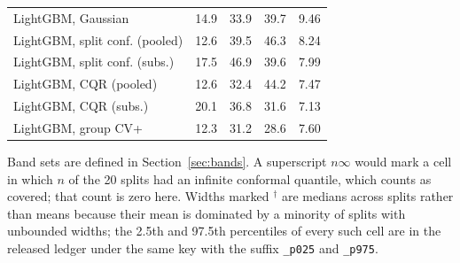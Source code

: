 \begin{table}[!tp]
\begin{tabular}{@{}lrrrr@{}}
\quad LightGBM, Gaussian & 14.9 & 33.9 & 39.7 & 9.46 \\
\quad LightGBM, split conf. (pooled) & 12.6 & 39.5 & 46.3 & 8.24 \\
\quad LightGBM, split conf. (subs.) & 17.5 & 46.9 & 39.6 & 7.99 \\
\quad LightGBM, CQR (pooled) & 12.6 & 32.4 & 44.2 & 7.47 \\
\quad LightGBM, CQR (subs.) & 20.1 & 36.8 & 31.6 & 7.13 \\
\quad LightGBM, group CV+ & 12.3 & 31.2 & 28.6 & 7.60 \\
\bottomrule
\end{tabular}
\par\smallskip\raggedright\footnotesize Band sets are defined in Section~\ref{sec:bands}. A superscript $n\infty$ would mark a cell in which $n$ of the 20 splits had an infinite conformal quantile, which counts as covered; that count is zero here. Widths marked $^{\dagger}$ are medians across splits rather than means because their mean is dominated by a minority of splits with unbounded widths; the 2.5th and 97.5th percentiles of every such cell are in the released ledger under the same key with the suffix \texttt{\_p025} and \texttt{\_p975}. 
\end{table}
